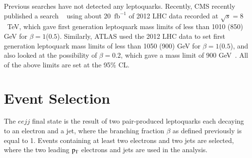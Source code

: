 Previous searches have not detected any leptoquarks. Recently, CMS recently published a search ~\cite{CMS-PAS-EXO-12-041} using about 20~$\text{fb}^{-1}$ of 2012 LHC data recorded at $\sqrt{s}=8$~TeV, which gave first generation
leptoquark mass limits of less than 1010 (850) GeV for $\beta=1$($0.5$).%
 Similarly, ATLAS used the 2012 LHC data to set first generation leptoquark mass limits of less than 1050 (900) GeV for $\beta=1$($0.5$),
and also looked at the possibility of $\beta=0.2$, which gave a mass limit of 900 GeV~\cite{atlasLQ8TeVpaper}.
All of the above limits are set at the 95\% CL.



\section{Event Selection}


The $eejj$ final state is the result of two pair-produced leptoquarks each decaying to an electron and a jet, where the branching fraction $\beta$ as defined previously is equal to 1. Events containing at least two electrons and two jets are selected, where the two leading $\rm p_{T}$ electrons and jets are used in the analysis.

